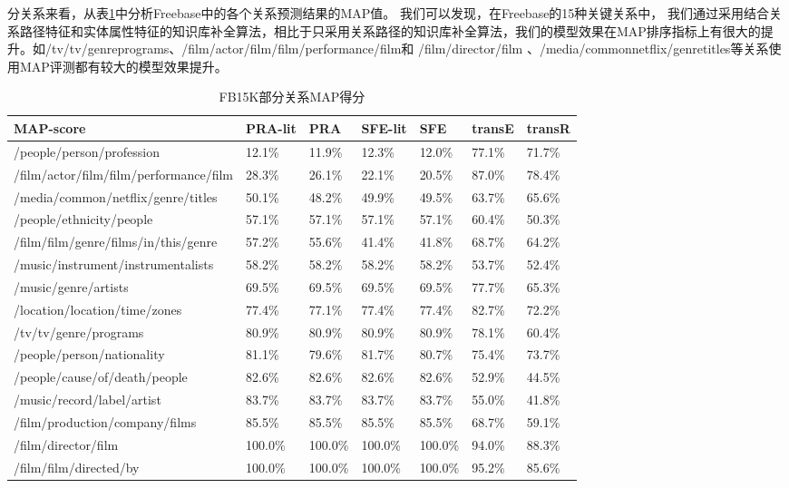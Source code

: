 分关系来看，从表\ref{tab:addlabel-fb-map}中分析Freebase中的各个关系预测结果的MAP值。
我们可以发现，在Freebase的15种关键关系中，
我们通过采用结合关系路径特征和实体属性特征的知识库补全算法，相比于只采用关系路径的知识库补全算法，我们的模型效果在MAP排序指标上有很大的提升。如/tv/tv/genreprograms、/film/actor/film/film/performance/film和 /film/director/film 、/media/commonnetflix/genretitles等关系使用MAP评测都有较大的模型效果提升。

\begin{table}[htbp]
  \centering
  \caption{FB15K部分关系MAP得分}
    \begin{tabular}{|p{5.8cm}|p{1.4cm}|p{1.4cm}|p{1.4cm}|p{1.4cm}|p{1.4cm}|p{1.4cm}|} %
    \hline
    MAP-score & \multicolumn{1}{l|}{PRA-lit  } & \multicolumn{1}{l|}{PRA} & \multicolumn{1}{l|}{SFE-lit} & \multicolumn{1}{l|}{SFE} & \multicolumn{1}{l|}{transE} & \multicolumn{1}{l|}{transR} \\
    \hline
    /people/person/profession & 12.1\% & 11.9\% & 12.3\% & 12.0\% & 77.1\% & 71.7\% \\
    \hline
    /film/actor/film/film/performance/film & 28.3\% & 26.1\% & 22.1\% & 20.5\% & 87.0\% & 78.4\% \\
    \hline
    /media/common/netflix/genre/titles & 50.1\% & 48.2\% & 49.9\% & 49.5\% & 63.7\% & 65.6\% \\
    \hline
    /people/ethnicity/people & 57.1\% & 57.1\% & 57.1\% & 57.1\% & 60.4\% & 50.3\% \\
    \hline
    /film/film/genre/films/in/this/genre & 57.2\% & 55.6\% & 41.4\% & 41.8\% & 68.7\% & 64.2\% \\
    \hline
    /music/instrument/instrumentalists & 58.2\% & 58.2\% & 58.2\% & 58.2\% & 53.7\% & 52.4\% \\
    \hline
    /music/genre/artists & 69.5\% & 69.5\% & 69.5\% & 69.5\% & 77.7\% & 65.3\% \\
    \hline
    /location/location/time/zones & 77.4\% & 77.1\% & 77.4\% & 77.4\% & 82.7\% & 72.2\% \\
    \hline
    /tv/tv/genre/programs & 80.9\% & 80.9\% & 80.9\% & 80.9\% & 78.1\% & 60.4\% \\
    \hline
    /people/person/nationality & 81.1\% & 79.6\% & 81.7\% & 80.7\% & 75.4\% & 73.7\% \\
    \hline
    /people/cause/of/death/people & 82.6\% & 82.6\% & 82.6\% & 82.6\% & 52.9\% & 44.5\% \\
    \hline
    /music/record/label/artist & 83.7\% & 83.7\% & 83.7\% & 83.7\% & 55.0\% & 41.8\% \\
    \hline
    /film/production/company/films & 85.5\% & 85.5\% & 85.5\% & 85.5\% & 68.7\% & 59.1\% \\
    \hline
    /film/director/film & 100.0\% & 100.0\% & 100.0\% & 100.0\% & 94.0\% & 88.3\% \\
    \hline
    /film/film/directed/by & 100.0\% & 100.0\% & 100.0\% & 100.0\% & 95.2\% & 85.6\% \\
    \hline
    \end{tabular}%
  \label{tab:addlabel-fb-map}%
\end{table}%

